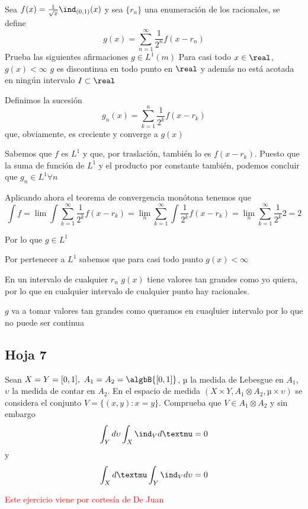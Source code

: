 \begin{problem}[14]
Sea $f(x) = \frac{1}{\sqrt{x}}\ind_{(0,1)}(x)$ y sea $\{r_n\}$ una enumeración de los racionales, se define
\[g(x)=\sum_{n=1}^{\infty}\frac{1}{2^n}f(x-r_n)\]
Prueba las siguientes afirmaciones
\ppart $g \in L^1(m)$
\ppart Para casi todo $x \in \real$, $g(x) < \infty$
\ppart $g$ es discontinua en todo punto en $\real$ y además no está acotada en ningún intervalo $I \subset \real$

\solution
\spart
Definimos la sucesión
\[g_n(x) = \sum_{k=1}^{n} \frac{1}{2^k}f(x-r_k)\]
que, obviamente, es creciente y converge a $g(x)$

Sabemos que $f$ es $L^1$ y que, por traslación, también lo es $f(x-r_k)$. Puesto que la suma de función de $L^1$ y el producto por constante también, podemos concluir que $g_n \in L^1 \forall n$

Aplicando ahora el teorema de convergencia monótona tenemos que
\[\int f = \lim \int \sum_{k=1}^{\infty} \frac{1}{2^k}f(x-r_k) = \lim_n  \sum_{k=1}^{\infty} \int \frac{1}{2^k}f(x-r_k) =\lim_n  \sum_{k=1}^{\infty}\frac{1}{2^k} 2 = 2\]

Por lo que $g \in L^1$

\spart
Por pertenecer a $L^1$ sabemos que para casi todo punto $g(x) < \infty$

\spart

En un intervalo de cualquier $r_n$ $g(x)$ tiene valores tan grandes como yo quiera, por lo que en cualquier intervalo de cualquier punto hay racionales.

$g$ va a tomar valores tan grandes como queramos en cuaqluier intervalo por lo que no puede ser continua
\end{problem}

\subsection{Hoja 7}
\begin{problem}[2]
Sean $X=Y=[0,1], \ A_1=A_2=\algbB{[0,1]}$, µ la medida de Lebesgue en $A_1$, $\upsilon$ la medida de contar en $A_2$. En el espacio de medida $(X\times Y, A_1 \otimes A_2, µ \times \upsilon)$ se considera el conjunto $V = \{(x,y): x=y\}$.
Comprueba que $V \in A_1 \otimes A_2$ y sin embargo
\[\int_Y d \upsilon \int_X \ind_V dµ = 0\]
y
\[\int_X d µ \int_Y \ind_V d\upsilon = 0\]

\solution
\textcolor{red}{Este ejercicio viene por cortesía de De Juan}

\end{problem}
